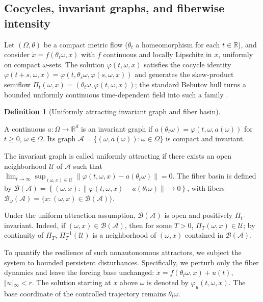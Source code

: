 \documentclass[pdflatex,sn-mathphys-num]{sn-jnl}
\numberwithin{equation}{section}
\theoremstyle{thmstyleone}%
\theoremstyle{definition}
\newtheorem{definition}[theorem]{Definition}
\theoremstyle{remark}
\begin{document}
\subsection{Cocycles, invariant graphs, and fiberwise intensity}
\label{subsec:skew-product-framework}

Let $(\Omega,\theta)$ be a compact metric flow ($\theta_t$ a homeomorphism for each $t\in\mathbb R$), and consider $\dot x=f(\theta_t\omega,x)$ with $f$ continuous and locally Lipschitz in $x$, uniformly on compact $\omega$-sets. The solution $\varphi(t,\omega,x)$ satisfies the cocycle identity $\varphi(t+s,\omega,x)=\varphi(t,\theta_s\omega,\varphi(s,\omega,x))$ and generates the skew-product semiflow $\Pi_t(\omega,x)=(\theta_t\omega,\varphi(t,\omega,x))$; the standard Bebutov hull turns a bounded uniformly continuous time-dependent field into such a family \citep{kloeden2011nonautonomous}.

\begin{definition}[Uniformly attracting invariant graph and fiber basin]
\label{def:attracting-invariant-graph}

A continuous $a:\Omega\to\mathbb R^d$ is an invariant graph if
$a(\theta_t\omega) = \varphi(t,\omega,a(\omega))$ for $t\geq0$, $\omega\in\Omega$.
Its graph $\mathcal A = \{(\omega,a(\omega)):\omega\in\Omega\}$
is compact and invariant.

The invariant graph is called uniformly attracting if there exists an open neighborhood $\mathcal U$ of $\mathcal A$ such that
$\lim_{t\to\infty}
\sup_{(\omega,x)\in\mathcal U}
\|
\varphi(t,\omega,x)-a(\theta_t\omega)
\|
=
0$.
The fiber basin is defined by
$\mathcal B(\mathcal A)
=
\left\{
(\omega,x):
\|
\varphi(t,\omega,x)-a(\theta_t\omega)
\|
\to0
\right\}$,
with fibers
$\mathcal B_\omega(\mathcal A)
=
\{x:(\omega,x)\in\mathcal B(\mathcal A)\}$.

Under the uniform attraction assumption, $\mathcal B(\mathcal A)$ is open and positively $\Pi_t$-invariant. Indeed, if $(\omega,x)\in\mathcal B(\mathcal A)$, then for some $T>0$, $\Pi_T(\omega,x)\in\mathcal U$; by continuity of $\Pi_T$,
$\Pi_T^{-1}(\mathcal U)$ is a neighborhood of $(\omega,x)$ contained in $\mathcal B(\mathcal A)$.
\end{definition}

To quantify the resilience of such nonautonomous attractors, we subject the system to bounded persistent disturbances. Specifically, we perturb only the fiber dynamics and leave the forcing base unchanged: $\dot x = f(\theta_t\omega,x)+u(t)$, $\Vert{}u\Vert{}_\infty<r$. The solution starting at $x$ above $\omega$ is denoted by $\varphi_u(t,\omega,x)$. The base coordinate of the controlled trajectory remains $\theta_t\omega$.
\end{document}
